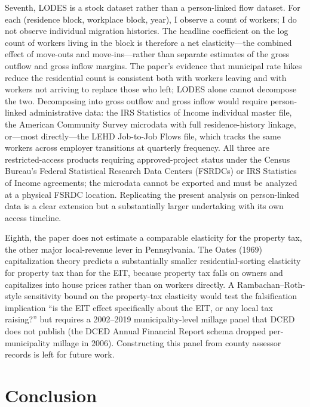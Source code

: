 \documentclass[12pt]{article}
\begin{document}
Seventh, LODES is a stock dataset rather than a person-linked
flow dataset. For each (residence block, workplace block, year), I
observe a count of workers; I do not observe individual migration
histories. The headline coefficient on the log count of workers
living in the block is therefore a net elasticity---the
combined effect of move-outs and move-ins---rather than separate
estimates of the gross outflow and gross inflow margins. The
paper's evidence that municipal rate hikes reduce the residential
count is consistent both with workers leaving and with workers not
arriving to replace those who left; LODES alone cannot decompose
the two. Decomposing into gross outflow and gross inflow would
require person-linked administrative data: the IRS Statistics of
Income individual master file, the American Community Survey
microdata with full residence-history linkage, or---most
directly---the LEHD Job-to-Job Flows file, which tracks the same
workers across employer transitions at quarterly frequency. All
three are restricted-access products requiring approved-project
status under the Census Bureau's Federal Statistical Research Data
Centers (FSRDCs) or IRS Statistics of Income agreements; the
microdata cannot be exported and must be analyzed at a physical
FSRDC location. Replicating the present analysis on
person-linked data is a clear extension but a substantially larger
undertaking with its own access timeline.

Eighth, the paper does not estimate a comparable elasticity for
the property tax, the other major local-revenue lever in
Pennsylvania. The Oates (1969) capitalization theory predicts a
substantially smaller residential-sorting elasticity for property
tax than for the EIT, because property tax falls on owners and
capitalizes into house prices rather than on workers directly. A
Rambachan--Roth-style sensitivity bound on the property-tax
elasticity would test the falsification implication ``is the EIT
effect specifically about the EIT, or any local tax raising?'' but
requires a 2002--2019 municipality-level millage panel that DCED does not
publish (the DCED Annual Financial Report schema dropped per-municipality
millage in 2006). Constructing this panel from county assessor
records is left for future work.

\section{Conclusion}
\label{sec:conclusion}
\end{document}
